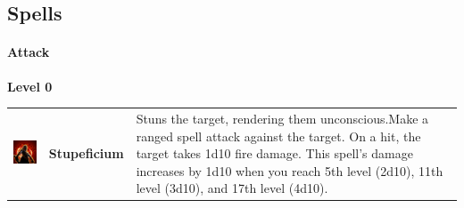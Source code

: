 \pagebreak

\subsection{Spells}

\paragraph{Attack} 

\textbf{Level 0} 
\begin{tabular}{ m{4cm}m{3cm}m{6cm} } 
	\includegraphics[width=4cm]{../Pictures/Gameplay/Spells/Icon/spell_icon.png} & \textbf{Stupeficium} & Stuns the target, rendering them unconscious.Make a ranged spell attack against the target. On a hit, the target takes 1d10 fire damage. This spell's damage increases by 1d10 when you reach 5th level (2d10), 11th level (3d10), and 17th level (4d10). \\ 
\end{tabular}

